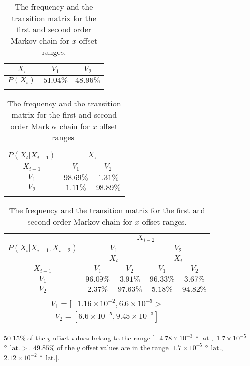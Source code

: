 \documentclass[preprint,12pt]{elsarticle}
\begin{document}
\begin{table}[!ht]
\centering
\begin{tabular}{|c|c|c|}
\hline
$X_{i}$ & $V_{1}$ & $V_{2}$\\ \hline
$P(X_{i})$ & $51.04\%$ & $48.96\%$\\ \hline
\multicolumn{3}{c}{}\\
\end{tabular}

\begin{tabular}{|c|c|c|}
\hline
$P(X_{i}|X_{i-1})$ & \multicolumn{2}{|c|}{$X_{i}$}\\ \hline
$X_{i-1}$ & $V_{1}$ & $V_{2}$\\ \hline
$V_{1}$ & $98.69\%$ & $1.31\%$\\ \hline
$V_{2}$ & $1.11\%$ & $98.89\%$\\ \hline
\multicolumn{3}{c}{}\\
\end{tabular}

\begin{tabular}{|c|c|c|c|c|}
\hline
\multirow{3}{*}{$P(X_{i}|X_{i-1},X_{i-2})$} & \multicolumn{4}{|c|}{$X_{i-2}$}\\ \cline{2-5}
 & \multicolumn{2}{|c|}{$V_{1}$} & \multicolumn{2}{|c|}{$V_{2}$}\\ \cline{2-5}
 & \multicolumn{2}{|c|}{$X_{i}$} & \multicolumn{2}{|c|}{$X_{i}$}\\ \hline
$X_{i-1}$ & $V_{1}$ & $V_{2}$ & $V_{1}$ & $V_{2}$\\ \hline
$V_{1}$ & $96.09\%$ & $3.91\%$ & $96.33\%$ & $3.67\%$\\ \hline
$V_{2}$ & $2.37\%$ & $97.63\%$ & $5.18\%$ & $94.82\%$\\ \hline
\multicolumn{5}{c}{}\\
\multicolumn{5}{c}{$V_{1} = [-1.16 \times 10^{-2}, 6.6 \times 10^{-5}>$}\\
\multicolumn{5}{c}{$V_{2} = [6.6 \times 10^{-5}, 9.45 \times 10^{-3}]$}\\
\end{tabular}
\caption{The frequency and the transition matrix for the first and second order Markov chain for $x$ offset ranges.}
\label{tab:longitude_no_abs}
\end{table}

$50.15\%$ of the $y$ offset values belong to the range $[-4.78 \times 10^{-3}$ $\degree$ $\mathrm{lat.},$ $1.7 \times 10^{-5}$ $\degree$ $\mathrm{lat.}>$. $49.85\%$ of the $y$ offset values are in the range $[1.7 \times 10^{-5}$ $\degree$ $\mathrm{lat.},$ $2.12 \times 10^{-2}$ $\degree$ $\mathrm{lat.}]$.
\end{document}
